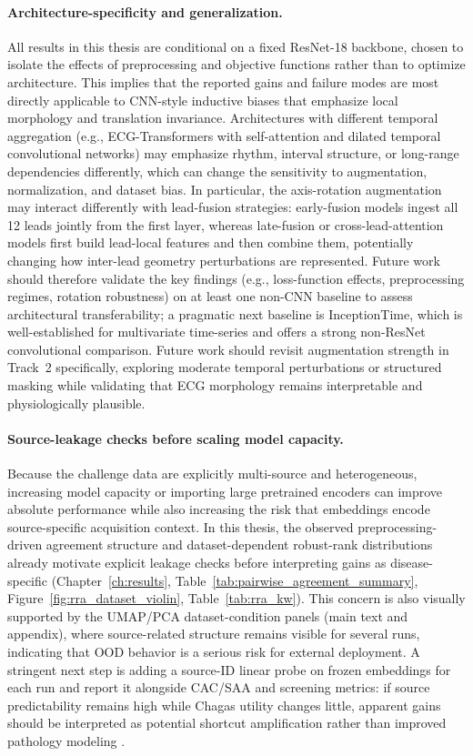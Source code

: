 \paragraph{Architecture-specificity and generalization.}
All results in this thesis are conditional on a fixed ResNet-18 backbone, chosen to isolate the effects of preprocessing and objective functions rather than to optimize architecture.
This implies that the reported gains and failure modes are most directly applicable to CNN-style inductive biases that emphasize local morphology and translation invariance.
Architectures with different temporal aggregation (e.g., ECG-Transformers with self-attention and dilated temporal convolutional networks) may emphasize rhythm, interval structure, or long-range dependencies differently, which can change the sensitivity to augmentation, normalization, and dataset bias.
In particular, the axis-rotation augmentation may interact differently with lead-fusion strategies: early-fusion models ingest all 12 leads jointly from the first layer, whereas late-fusion or cross-lead-attention models first build lead-local features and then combine them, potentially changing how inter-lead geometry perturbations are represented.
Future work should therefore validate the key findings (e.g., loss-function effects, preprocessing regimes, rotation robustness) on at least one non-CNN baseline to assess architectural transferability; a pragmatic next baseline is InceptionTime, which is well-established for multivariate time-series and offers a strong non-ResNet convolutional comparison.
Future work should revisit augmentation strength in Track~2 specifically, exploring moderate temporal perturbations or structured masking while validating that ECG morphology remains interpretable and physiologically plausible.

\paragraph{Source-leakage checks before scaling model capacity.}
Because the challenge data are explicitly multi-source and heterogeneous, increasing model capacity or importing large pretrained encoders can improve absolute performance while also increasing the risk that embeddings encode source-specific acquisition context.
In this thesis, the observed preprocessing-driven agreement structure and dataset-dependent robust-rank distributions already motivate explicit leakage checks before interpreting gains as disease-specific (Chapter~\ref{ch:results}, Table~\ref{tab:pairwise_agreement_summary}, Figure~\ref{fig:rra_dataset_violin}, Table~\ref{tab:rra_kw}).
This concern is also visually supported by the UMAP/PCA dataset-condition panels (main text and appendix), where source-related structure remains visible for several runs, indicating that OOD behavior is a serious risk for external deployment.
A stringent next step is adding a source-ID linear probe on frozen embeddings for each run and report it alongside CAC/SAA and screening metrics: if source predictability remains high while Chagas utility changes little, apparent gains should be interpreted as potential shortcut amplification rather than improved pathology modeling \parencite{2025ChallengeCinC}.

